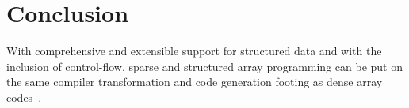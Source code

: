 \section{Conclusion}
With comprehensive and extensible support for structured data and with the inclusion of control-flow, sparse and structured array programming can be put on the same compiler transformation and code generation footing as dense array codes~\cite{fred-taco}.